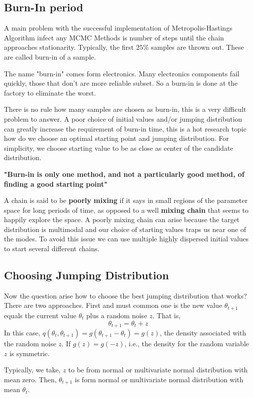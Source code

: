 \subsection{Burn-In period}
A main problem with the successful implementation of Metropolis-Hastings Algorithm infect any MCMC Methods is number of steps until the chain approaches stationarity.
Typically, the first $ 25\% $ samples are thrown out. These are called burn-in of a sample.

The name "burn-in" comes form electronics. Many electronics components fail quickly, those that don't are more reliable subset. So a burn-in is done at the factory to eliminate the worst.

There is no rule how many samples are chosen as burn-in, this is a very difficult problem to answer. A poor choice of initial values and/or jumping distribution can greatly increase the requirement of burn-in time, this is a hot research topic how do we choose an optimal starting point and jumping distribution. For simplicity, we choose starting value to be as close as center of the candidate distribution.

\textbf{"Burn-in is only one method, and not a particularly good method, of finding a good starting point"}

A chain is said to be \textbf{poorly mixing} if it says in small regions of the parameter
space for long periods of time, as opposed to a well \textbf{mixing chain} that seems to
happily explore the space. A poorly mixing chain can arise because the target
distribution is multimodal and our choice of starting values traps us near one of the modes.
To avoid this issue we can use multiple highly dispersed initial values to start several different chains.

\subsection{Choosing Jumping Distribution}
Now the question arise how to choose the best jumping distribution that works?
There are two approaches. First and must common one is the new value $ \theta_{t+1} $ equals the current value $ \theta_t $ plus a random noise $ z $. That is,
\[
	\theta_{t+1} = \theta_t + z
\]
In this case, $ q(\theta_{t},\theta_{t+1}) = g(\theta_{t+1}-\theta_t) = g(z) $, the density associated with the random noise $ z $. If $ g(z) = g(-z) $, i.e., the density for the random variable $ z $ is symmetric.

Typically, we take, $ z $ to be from normal or multivariate normal distribution with mean zero. Then, $ \theta_{t+1} $ is form normal or multivariate normal distribution with mean $ \theta_t $.

